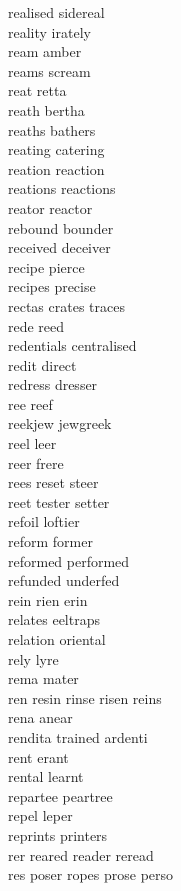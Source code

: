 realised sidereal\\
reality irately\\
ream amber \\
reams scream \\
reat retta \\
reath bertha \\
reaths bathers \\
reating catering \\
reation reaction \\
reations reactions \\
reator reactor \\
rebound bounder\\
received deceiver\\
recipe pierce\\
recipes precise\\
rectas crates traces\\
rede reed\\
redentials centralised \\
redit direct \\
redress dresser\\
ree reef \\
reekjew jewgreek \\
reel leer\\
reer frere \\
rees reset steer \\
reet tester setter  \\
refoil loftier \\
reform former\\
reformed performed \\
refunded underfed\\
rein rien erin\\
relates eeltraps \\
relation oriental\\
rely lyre\\
rema mater \\
ren resin rinse risen reins  \\
rena anear \\
rendita trained ardenti\\
rent erant \\
rental learnt\\
repartee peartree\\
repel leper\\
reprints printers\\
rer reared reader reread   \\
res poser ropes prose perso  \\
